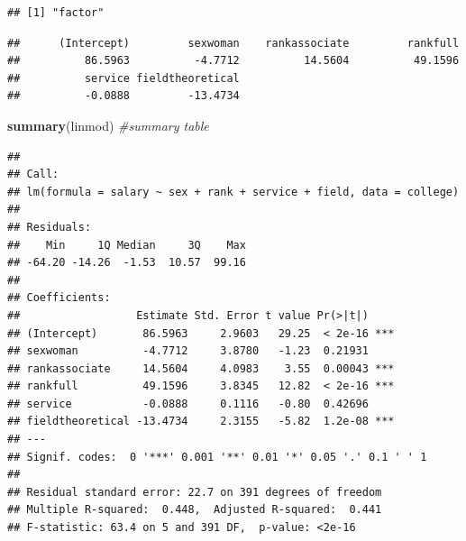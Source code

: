 \documentclass[
  11pt,
  letterpaper,
]{book}
\newenvironment{Shaded}{\begin{snugshade}}{\end{snugshade}}
\newcommand{\CommentTok}[1]{\textcolor[rgb]{0.56,0.35,0.01}{\textit{#1}}}
\newcommand{\DataTypeTok}[1]{\textcolor[rgb]{0.13,0.29,0.53}{#1}}
\newcommand{\KeywordTok}[1]{\textcolor[rgb]{0.13,0.29,0.53}{\textbf{#1}}}
\newcommand{\NormalTok}[1]{#1}
\newcommand{\OperatorTok}[1]{\textcolor[rgb]{0.81,0.36,0.00}{\textbf{#1}}}
\newcommand{\StringTok}[1]{\textcolor[rgb]{0.31,0.60,0.02}{#1}}
\theoremstyle{definition}
\theoremstyle{definition}
\theoremstyle{definition}
\theoremstyle{remark}
\begin{document}
\begin{Shaded}
\end{Shaded}

\begin{verbatim}
## [1] "factor"
\end{verbatim}

\begin{Shaded}
\end{Shaded}

\begin{verbatim}
##      (Intercept)         sexwoman    rankassociate         rankfull 
##          86.5963          -4.7712          14.5604          49.1596 
##          service fieldtheoretical 
##          -0.0888         -13.4734
\end{verbatim}

\begin{Shaded}
\begin{Highlighting}[]
\KeywordTok{summary}\NormalTok{(linmod) }\CommentTok{\#summary table}
\end{Highlighting}
\end{Shaded}

\begin{verbatim}
## 
## Call:
## lm(formula = salary ~ sex + rank + service + field, data = college)
## 
## Residuals:
##    Min     1Q Median     3Q    Max 
## -64.20 -14.26  -1.53  10.57  99.16 
## 
## Coefficients:
##                  Estimate Std. Error t value Pr(>|t|)    
## (Intercept)       86.5963     2.9603   29.25  < 2e-16 ***
## sexwoman          -4.7712     3.8780   -1.23  0.21931    
## rankassociate     14.5604     4.0983    3.55  0.00043 ***
## rankfull          49.1596     3.8345   12.82  < 2e-16 ***
## service           -0.0888     0.1116   -0.80  0.42696    
## fieldtheoretical -13.4734     2.3155   -5.82  1.2e-08 ***
## ---
## Signif. codes:  0 '***' 0.001 '**' 0.01 '*' 0.05 '.' 0.1 ' ' 1
## 
## Residual standard error: 22.7 on 391 degrees of freedom
## Multiple R-squared:  0.448,	Adjusted R-squared:  0.441 
## F-statistic: 63.4 on 5 and 391 DF,  p-value: <2e-16
\end{verbatim}
\end{document}

